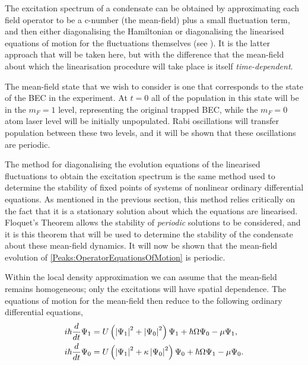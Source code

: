 The excitation spectrum of a condensate can be obtained by approximating each field operator to be a c-number (the mean-field) plus a small fluctuation term, and then either diagonalising the Hamiltonian \cite{Bogoliubov:1947,FetterWalecka} or diagonalising the linearised equations of motion for the fluctuations themselves (see ). It is the latter approach that will be taken here, but with the difference that the mean-field about which the linearisation procedure will take place is itself \emph{time-dependent}.

The mean-field state that we wish to consider is one that corresponds to the state of the BEC in the experiment. At $t=0$ all of the population in this state will be in the $m_F=1$ level, representing the original trapped BEC, while the $m_F=0$ atom laser level will be initially unpopulated. Rabi oscillations will transfer population between these two levels, and it will be shown that these oscillations are periodic.

The method for diagonalising the evolution equations of the linearised fluctuations to obtain the excitation spectrum is the same method used to determine the stability of fixed points of systems of nonlinear ordinary differential equations. As mentioned in the previous section, this method relies critically on the fact that it is a stationary solution about which the equations are linearised. Floquet's Theorem \citep{AppliedNonlinearDynamics:1995} allows the stability of \emph{periodic} solutions to be considered, and it is this theorem that will be used to determine the stability of the condensate about these mean-field dynamics. It will now be shown that the mean-field evolution of \eqref{Peaks:OperatorEquationsOfMotion} is periodic.

Within the local density approximation we can assume that the mean-field remains homogeneous; only the excitations will have spatial dependence. The equations of motion for the mean-field then reduce to the following ordinary differential equations,
\begin{subequations}
    \label{Peaks:MeanFieldEquationsOfMotion}
    \begin{align}
    i \hbar \frac{d }{dt}\Psi_1 &= U\left(\abs{\Psi_1}^2 + \abs{\Psi_0}^2\right)\Psi_1 + \hbar \Omega \Psi_0 - \mu \Psi_1,\\
    i \hbar \frac{d }{dt}\Psi_0 &= U\left(\abs{\Psi_1}^2 + \kappa \abs{\Psi_0}^2\right)\Psi_0 + \hbar \Omega \Psi_1 - \mu \Psi_0.
    \end{align}
\end{subequations}

